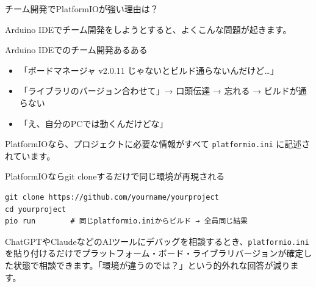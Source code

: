 \begin{qabox}{チーム開発でPlatformIOが強い理由は？}

Arduino IDEでチーム開発をしようとすると、よくこんな問題が起きます。

\begin{badexample}{Arduino IDEでのチーム開発あるある}
\begin{itemize}
  \item 「ボードマネージャ v2.0.11 じゃないとビルド通らないんだけど…」
  \item 「ライブラリのバージョン合わせて」→ 口頭伝達 → 忘れる → ビルドが通らない
  \item 「え、自分のPCでは動くんだけどな」
\end{itemize}
\end{badexample}

PlatformIOなら、プロジェクトに必要な情報がすべて \texttt{platformio.ini} に記述されています。

\begin{goodexample}{PlatformIOならgit cloneするだけで同じ環境が再現される}
\begin{lstlisting}
git clone https://github.com/yourname/yourproject
cd yourproject
pio run        # 同じplatformio.iniからビルド → 全員同じ結果
\end{lstlisting}
\end{goodexample}

\begin{notebox}[AIとのデバッグでも強い]
ChatGPTやClaudeなどのAIツールにデバッグを相談するとき、\texttt{platformio.ini} を貼り付けるだけでプラットフォーム・ボード・ライブラリバージョンが確定した状態で相談できます。「環境が違うのでは？」という的外れな回答が減ります。
\end{notebox}

\end{qabox}

